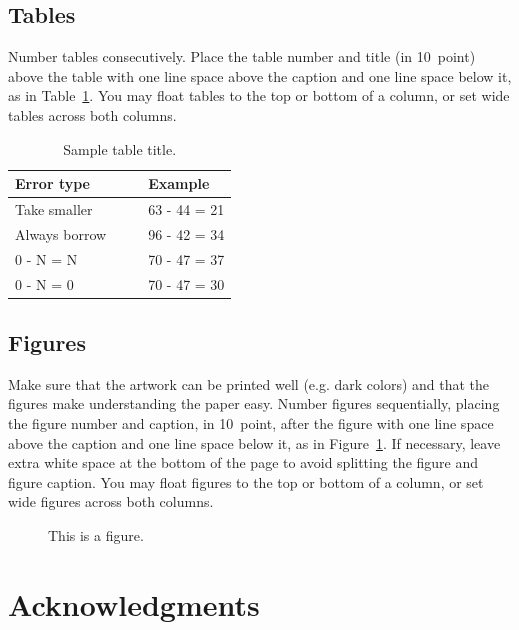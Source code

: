 \documentclass[10pt,letterpaper]{article}
\begin{document}
\subsection{Tables}

Number tables consecutively. Place the table number and title (in
10~point) above the table with one line space above the caption and
one line space below it, as in Table~\ref{sample-table}. You may float
tables to the top or bottom of a column, or set wide tables across
both columns.

\begin{table}[!ht]
\begin{center} 
\caption{Sample table title.} 
\label{sample-table} 
\vskip 0.12in
\begin{tabular}{ll} 
\hline
Error type    &  Example \\
\hline
Take smaller        &   63 - 44 = 21 \\
Always borrow~~~~   &   96 - 42 = 34 \\
0 - N = N           &   70 - 47 = 37 \\
0 - N = 0           &   70 - 47 = 30 \\
\hline
\end{tabular} 
\end{center} 
\end{table}


\subsection{Figures}

Make sure that the artwork can be printed well (e.g. dark colors) and that 
the figures make understanding the paper easy.
 Number figures sequentially, placing the figure
number and caption, in 10~point, after the figure with one line space
above the caption and one line space below it, as in
Figure~\ref{sample-figure}. If necessary, leave extra white space at
the bottom of the page to avoid splitting the figure and figure
caption. You may float figures to the top or bottom of a column, or
set wide figures across both columns.

\begin{figure}[ht]
\begin{center}
\end{center}
\caption{This is a figure.} 
\label{sample-figure}
\end{figure}


\section{Acknowledgments}
\end{document}
